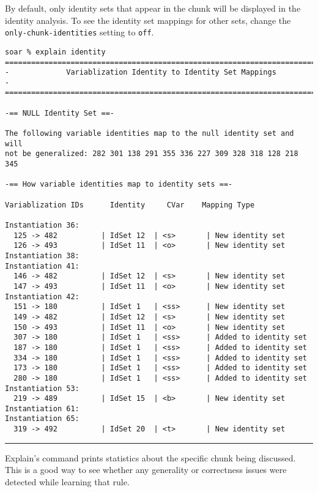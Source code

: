 By default, only identity sets that appear in the chunk will be
displayed in the identity analysis. To see the identity set mappings for
other sets, change the \texttt{only-chunk-identities} setting to
\texttt{off}.

{\scriptsize
\begin{verbatim}
soar % explain identity
=========================================================================
-             Variablization Identity to Identity Set Mappings          -
=========================================================================

-== NULL Identity Set ==-

The following variable identities map to the null identity set and will
not be generalized: 282 301 138 291 355 336 227 309 328 318 128 218 345

-== How variable identities map to identity sets ==-

Variablization IDs      Identity     CVar    Mapping Type

Instantiation 36:
  125 -> 482          | IdSet 12  | <s>       | New identity set
  126 -> 493          | IdSet 11  | <o>       | New identity set
Instantiation 38:
Instantiation 41:
  146 -> 482          | IdSet 12  | <s>       | New identity set
  147 -> 493          | IdSet 11  | <o>       | New identity set
Instantiation 42:
  151 -> 180          | IdSet 1   | <ss>      | New identity set
  149 -> 482          | IdSet 12  | <s>       | New identity set
  150 -> 493          | IdSet 11  | <o>       | New identity set
  307 -> 180          | IdSet 1   | <ss>      | Added to identity set
  187 -> 180          | IdSet 1   | <ss>      | Added to identity set
  334 -> 180          | IdSet 1   | <ss>      | Added to identity set
  173 -> 180          | IdSet 1   | <ss>      | Added to identity set
  280 -> 180          | IdSet 1   | <ss>      | Added to identity set
Instantiation 53:
  219 -> 489          | IdSet 15  | <b>       | New identity set
Instantiation 61:
Instantiation 65:
  319 -> 492          | IdSet 20  | <t>       | New identity set
\end{verbatim}
}

\rule{\textwidth}{1pt}

\textbf{}

Explain's  command prints statistics about the specific chunk being discussed.  This is a good way to see whether any generality or correctness issues were detected while learning that rule.

